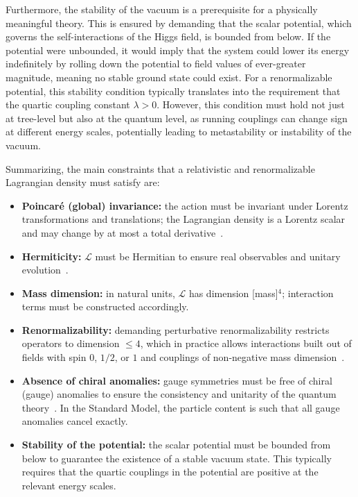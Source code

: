 Furthermore, the stability of the vacuum is a prerequisite for a physically meaningful theory. This is ensured by demanding that the scalar potential, which governs the self-interactions of the Higgs field, is bounded from below. If the potential were unbounded, it would imply that the system could lower its energy indefinitely by rolling down the potential to field values of ever-greater magnitude, meaning no stable ground state could exist. For a renormalizable potential, this stability condition typically translates into the requirement that the quartic coupling constant $\lambda > 0$. However, this condition must hold not just at tree-level but also at the quantum level, as running couplings can change sign at different energy scales, potentially leading to metastability or instability of the vacuum.


Summarizing, the main constraints that a relativistic and renormalizable Lagrangian density must satisfy are:
\begin{itemize}
	\item \textbf{Poincaré (global) invariance:} the action must be invariant under Lorentz transformations and translations; the Lagrangian density is a Lorentz scalar and may change by at most a total derivative~\parencite{pall,jose1998classical}. 
	\item \textbf{Hermiticity:} $\mathcal{L}$ must be Hermitian to ensure real observables and unitary evolution~\parencite{pall,peskin}.
	\item \textbf{Mass dimension:} in natural units, $\mathcal{L}$ has dimension [mass]$^4$; interaction terms must be constructed accordingly.
	\item \textbf{Renormalizability:} demanding perturbative renormalizability restricts operators to dimension $\leq 4$, which in practice allows interactions built out of fields with spin $0$, $1/2$, or $1$ and couplings of non-negative mass dimension~\parencite{peskin,Weinberg}.
	\item \textbf{Absence of chiral anomalies:} gauge symmetries must be free of chiral (gauge) anomalies to ensure the consistency and unitarity of the quantum theory~\parencite{peskin,Weinberg,bertlmann1996anomalies}. In the Standard Model, the particle content is such that all gauge anomalies cancel exactly.
	\item \textbf{Stability of the potential:} the scalar potential must be bounded from below to guarantee the existence of a stable vacuum state. This typically requires that the quartic couplings in the potential are positive at the relevant energy scales.
\end{itemize}

